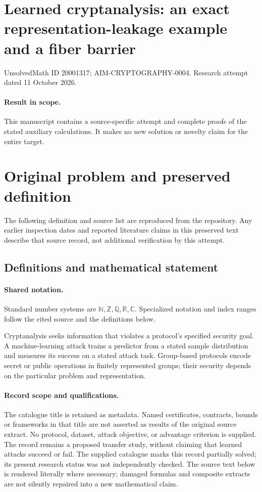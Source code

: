 \documentclass[11pt]{article}
\begin{document}
\section*{Learned cryptanalysis: an exact representation-leakage example and a fiber barrier}
\noindent UnsolvedMath ID 20001317; AIM-CRYPTOGRAPHY-0004. Research attempt dated 11 October 2026.
\paragraph{Result in scope.}This manuscript contains a source-specific attempt and complete proofs of the stated auxiliary calculations. It makes no new solution or novelty claim for the entire target.
\section{Original problem and preserved definition}
The following definition and source list are reproduced from the repository. Any earlier inspection dates and reported literature claims in this preserved text describe that source record, not additional verification by this attempt.
\subsection{Definitions and mathematical statement}

\paragraph{Shared notation.}Standard number systems are $\mathbb N,\mathbb Z,\mathbb Q,\mathbb R,\mathbb C$. Specialized notation and index ranges follow the cited source and the definitions below.


Cryptanalysis seeks information that violates a protocol's specified security goal. A machine-learning attack trains a predictor from a stated sample distribution and measures its success on a stated attack task. Group-based protocols encode secret or public operations in finitely represented groups; their security depends on the particular problem and representation.
\paragraph{Record scope and qualifications.}
The catalogue title is retained as metadata. Named certificates, contracts, bounds or frameworks in that title are not asserted as results of the original source extract.
No protocol, dataset, attack objective, or advantage criterion is supplied. The record remains a proposed transfer study, without claiming that learned attacks succeed or fail. The supplied catalogue marks this record partially solved; its present research status was not independently checked.
The source text below is rendered literally where necessary; damaged formulas and composite extracts are not silently repaired into a new mathematical claim.
\end{document}
